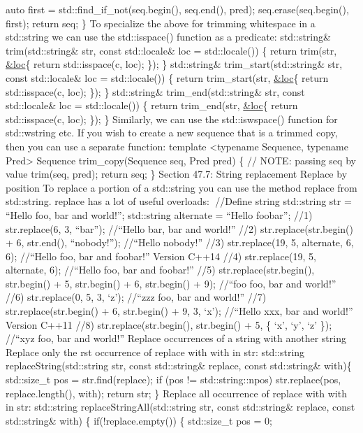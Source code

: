 auto first = std::find\_if\_not(seq.begin(), seq.end(), pred);
seq.erase(seq.begin(), first); return seq; \} To specialize the above
for trimming whitespace in a std::string we can use the std::isspace()
function as a predicate: std::string\& trim(std::string\& str, const
std::locale\& loc = std::locale()) \{ return trim(str,
\href{const\%20char\%20c}{\&loc}\{ return std::isspace(c, loc); \}); \}
std::string\& trim\_start(std::string\& str, const std::locale\& loc =
std::locale()) \{ return trim\_start(str,
\href{const\%20char\%20c}{\&loc}\{ return std::isspace(c, loc); \}); \}
std::string\& trim\_end(std::string\& str, const std::locale\& loc =
std::locale()) \{ return trim\_end(str,
\href{const\%20char\%20c}{\&loc}\{ return std::isspace(c, loc); \}); \}
Similarly, we can use the std::iswspace() function for std::wstring etc.
If you wish to create a new sequence that is a trimmed copy, then you
can use a separate function: template \textless typename Sequence,
typename Pred\textgreater{} Sequence trim\_copy(Sequence seq, Pred pred)
\{ // NOTE: passing seq by value trim(seq, pred); return seq; \} Section
47.7: String replacement Replace by position To replace a portion of a
std::string you can use the method replace from std::string. replace has
a lot of useful overloads: //Define string std::string str = ``Hello
foo, bar and world!''; std::string alternate = ``Hello foobar''; //1)
str.replace(6, 3, ``bar''); //``Hello bar, bar and world!'' //2)
str.replace(str.begin() + 6, str.end(), ``nobody!''); //``Hello
nobody!'' //3) str.replace(19, 5, alternate, 6, 6); //``Hello foo, bar
and foobar!'' Version C++14 //4) str.replace(19, 5, alternate, 6);
//``Hello foo, bar and foobar!'' //5) str.replace(str.begin(),
str.begin() + 5, str.begin() + 6, str.begin() + 9); //``foo foo, bar and
world!'' //6) str.replace(0, 5, 3, `z'); //``zzz foo, bar and world!''
//7) str.replace(str.begin() + 6, str.begin() + 9, 3, `x'); //``Hello
xxx, bar and world!'' Version C++11 //8) str.replace(str.begin(),
str.begin() + 5, \{ `x', `y', `z' \}); //``xyz foo, bar and world!''
Replace occurrences of a string with another string Replace only the rst
occurrence of replace with with in str: std::string
replaceString(std::string str, const std::string\& replace, const
std::string\& with)\{ std::size\_t pos = str.find(replace); if (pos !=
std::string::npos) str.replace(pos, replace.length(), with); return str;
\} Replace all occurrence of replace with with in str: std::string
replaceStringAll(std::string str, const std::string\& replace, const
std::string\& with) \{ if(!replace.empty()) \{ std::size\_t pos = 0;
